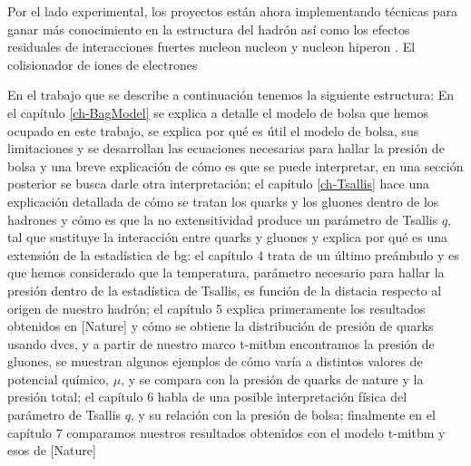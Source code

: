 Por el lado experimental, los proyectos están ahora implementando técnicas para ganar más conocimiento en la estructura del hadrón\cite{PhysRevLett.100.162002} así como los efectos residuales de interacciones fuertes nucleon nucleon y nucleon hiperon \cite{Collaboration2015,Mihaylov_2021}. El colisionador de iones de electrones 

En el trabajo que se describe a continuación tenemos la siguiente estructura: En el capítulo \ref{ch-BagModel} se explica a detalle el modelo de bolsa que hemos ocupado en este trabajo, se explica por qué es útil el modelo de bolsa, sus limitaciones y se desarrollan las ecuaciones necesarias para hallar la presión de bolsa y una breve explicación de cómo es que se puede interpretar, en una sección posterior se busca darle otra interpretación; el capítulo \ref{ch-Tsallis} hace una explicación detallada de cómo se tratan los quarks y los gluones dentro de los hadrones y cómo es que la no extensitividad produce un parámetro de Tsallis $q$, tal que sustituye la interacción entre quarks y gluones y explica por qué es una extensión de la estadística de \acrfull{bg}: el capítulo 4 trata de un último preámbulo y es que hemos considerado que la temperatura, parámetro necesario para hallar la presión dentro de la estadística de Tsallis, es función de la distacia respecto al origen de nuestro hadrón; el capítulo 5 explica primeramente los resultados obtenidos en [Nature] y cómo se obtiene la distribución de presión de quarks usando \acrshort{dvcs}, y a partir de nuestro marco \acrshort{t-mitbm} encontramos la presión de gluones, se muestran algunos ejemplos de cómo varía a distintos valores de potencial químico, $\mu$, y se compara con la presión de quarks de nature y la presión total; el capítulo 6 habla de una posible interpretación física del parámetro de Tsallis $q$, y su relación con la presión de bolsa; finalmente en el capítulo 7 comparamos nuestros resultados obtenidos con el modelo \acrshort{t-mitbm} y esos de [Nature]

\newpage

\thispagestyle{empty}